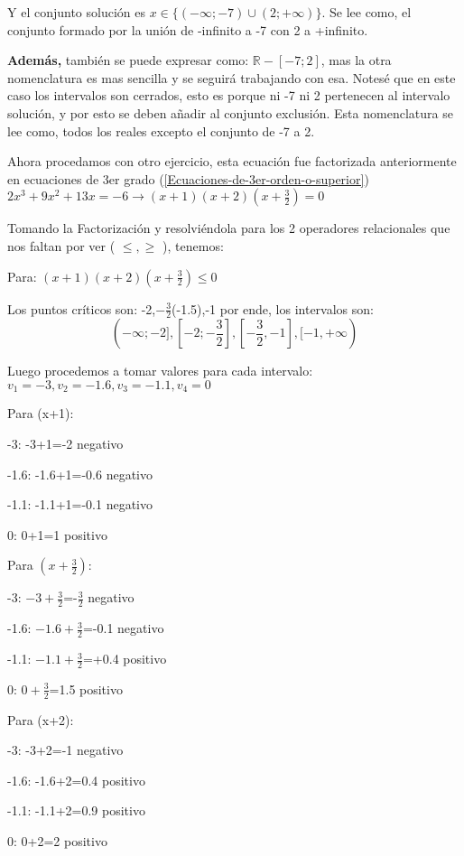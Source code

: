 \documentclass[12pt]{article}
\begin{document}
    Y el conjunto solución es $x\in \{(-\infty;-7)\cup(2;+\infty) \} $.
    Se lee como, el conjunto formado por la unión de -infinito  a -7 con 2 a +infinito.


    \textbf{Además,} también se puede expresar como: $ \mathbb{R}-{[-7;2]} $, mas
    la otra nomenclatura es mas sencilla y se seguirá trabajando con esa. Notesé
    que en este caso los intervalos son cerrados, esto es porque ni -7 ni 2 pertenecen
    al intervalo solución, y por esto se deben añadir al conjunto exclusión.
    Esta nomenclatura se lee como, todos los reales excepto el conjunto de -7 a 2.

    Ahora procedamos con otro ejercicio, esta ecuación fue factorizada anteriormente
    en ecuaciones de 3er grado (\ref{Ecuaciones-de-3er-orden-o-superior})
    $ 2x^3+9x^2+13x = -6 \rightarrow (x+1)(x+2)\left(x+\frac{3}{2}\right) =  0  $

    Tomando la Factorización y resolviéndola para los 2 operadores relacionales
    que nos faltan por ver ( $ \leq,\geq $  ), tenemos:

    Para: $ (x+1)(x+2)\left(x+\frac{3}{2}\right) \leq 0 $

    Los puntos críticos son: -2,$ -\frac{3}{2}$(-1.5),-1 por ende, los intervalos
    son:
    $$\displaystyle (-\infty;-2], [-2;-\frac{3}{2}],[-\frac{3}{2},-1],  [-1,+\infty) $$

    Luego procedemos a tomar valores para cada intervalo:
    $ v_1=-3,v_2= -1.6,v_3= -1.1,v_4= 0 $

    Para (x+1):

    -3: -3+1=-2 negativo

    -1.6: -1.6+1=-0.6 negativo

    -1.1: -1.1+1=-0.1 negativo

    0: 0+1=1 positivo

    Para $\left(x+\frac{3}{2}\right)$:

    -3: $-3+\frac{3}{2}$=-$\frac{3}{2} $ negativo

    -1.6: $-1.6+\frac{3}{2}$=-0.1 negativo

    -1.1: $-1.1+\frac{3}{2}$=+0.4 positivo

    0: $0+\frac{3}{2}$=1.5 positivo

    Para (x+2):

    -3: -3+2=-1 negativo

    -1.6: -1.6+2=0.4 positivo

    -1.1: -1.1+2=0.9 positivo

    0: 0+2=2 positivo
\end{document}
